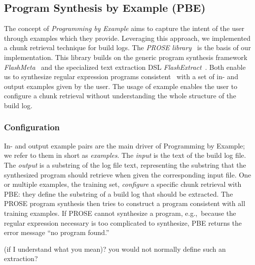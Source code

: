 \subsection{Program Synthesis by Example (PBE)}
The concept of \emph{Programming by Example} aims to capture the
intent of the user through examples which they provide.
Leveraging this approach, we implemented a chunk retrieval technique
for build logs.
The \emph{PROSE library}~\cite{prose2019webpage} is the basis of
our implementation.
This library builds on the generic program synthesis framework
\emph{FlashMeta}~\cite{polozov2015flashmeta:} and the specialized
text extraction DSL \emph{FlashExtract}~\cite{le2014flashextract:}.
Both enable us to synthesize regular expression programs
consistent~\cite{mitchell1982generalization} with a set of in-
and output examples given by the user.
The usage of example enables the user to configure a chunk
retrieval without understanding the whole structure of
the build log.

\subsubsection{Configuration}
In- and output example pairs are the main driver of Programming by
Example; we refer to them in short as \emph{examples}.
The \emph{input} is the text of the build log file.
The \emph{output} is
a substring of the log file text, representing the
substring that the synthesized program should retrieve when
given the corresponding input file.
One or multiple examples, the
training set, \emph{configure} a specific chunk retrieval with PBE:
they define the substring of a build log that should be extracted.
The PROSE program synthesis then tries to construct a program
consistent with all training examples.
If PROSE cannot synthesize a program, e.g.,\
because the regular expression
necessary is too complicated to synthesize, PBE returns the
error message ``no program found.''

(if I understand what you mean)? you would not normally define such
an extraction?
